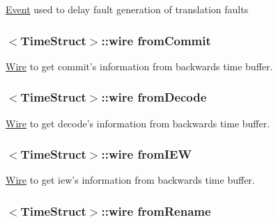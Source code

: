 \label{classDefaultFetch_a7bfa632a0dd4f5a541ceb627255286d3}
\hyperlink{classEvent}{Event} used to delay fault generation of translation faults \hypertarget{classDefaultFetch_a0055a92bd94eda21c2641d46ff013dac}{
\subsubsection[{fromCommit}]{$<${\bf TimeStruct}$>$::wire {\bf fromCommit}}}
\label{classDefaultFetch_a0055a92bd94eda21c2641d46ff013dac}
\hyperlink{classWire}{Wire} to get commit's information from backwards time buffer. \hypertarget{classDefaultFetch_a1116d028078c70aa1579726747303a55}{
\subsubsection[{fromDecode}]{$<${\bf TimeStruct}$>$::wire {\bf fromDecode}}}
\label{classDefaultFetch_a1116d028078c70aa1579726747303a55}
\hyperlink{classWire}{Wire} to get decode's information from backwards time buffer. \hypertarget{classDefaultFetch_a6c9093e88770a58dc8853f49a09bbac8}{
\subsubsection[{fromIEW}]{$<${\bf TimeStruct}$>$::wire {\bf fromIEW}}}
\label{classDefaultFetch_a6c9093e88770a58dc8853f49a09bbac8}
\hyperlink{classWire}{Wire} to get iew's information from backwards time buffer. \hypertarget{classDefaultFetch_ae99c54a9c8f1e218b86afcee348c54fc}{
\subsubsection[{fromRename}]{$<${\bf TimeStruct}$>$::wire {\bf fromRename}}}
